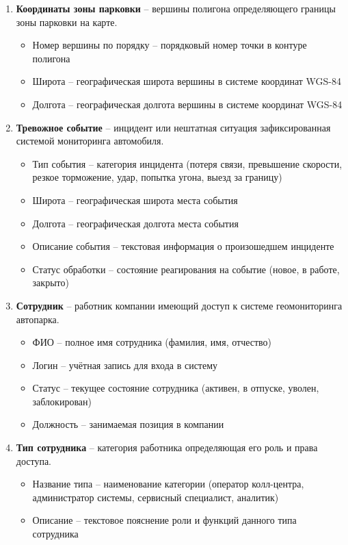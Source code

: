 \begin{enumerate}
\item \textbf{Координаты зоны парковки} -- вершины полигона определяющего границы зоны парковки на карте.
\begin{itemize}
\item Номер вершины по порядку -- порядковый номер точки в контуре полигона
\item Широта -- географическая широта вершины в системе координат WGS-84
\item Долгота -- географическая долгота вершины в системе координат WGS-84
\end{itemize}

\item \textbf{Тревожное событие} -- инцидент или нештатная ситуация зафиксированная системой мониторинга автомобиля.
\begin{itemize}
\item Тип события -- категория инцидента (потеря связи, превышение скорости, резкое торможение, удар, попытка угона, выезд за границу)
\item Широта -- географическая широта места события
\item Долгота -- географическая долгота места события
\item Описание события -- текстовая информация о произошедшем инциденте
\item Статус обработки -- состояние реагирования на событие (новое, в работе, закрыто)
\end{itemize}

\item \textbf{Сотрудник} -- работник компании имеющий доступ к системе геомониторинга автопарка.
\begin{itemize}
\item ФИО -- полное имя сотрудника (фамилия, имя, отчество)
\item Логин -- учётная запись для входа в систему
\item Статус -- текущее состояние сотрудника (активен, в отпуске, уволен, заблокирован)
\item Должность -- занимаемая позиция в компании
\end{itemize}

\item \textbf{Тип сотрудника} -- категория работника определяющая его роль и права доступа.
\begin{itemize}
\item Название типа -- наименование категории (оператор колл-центра, администратор системы, сервисный специалист, аналитик)
\item Описание -- текстовое пояснение роли и функций данного типа сотрудника
\end{itemize}


\end{enumerate}

